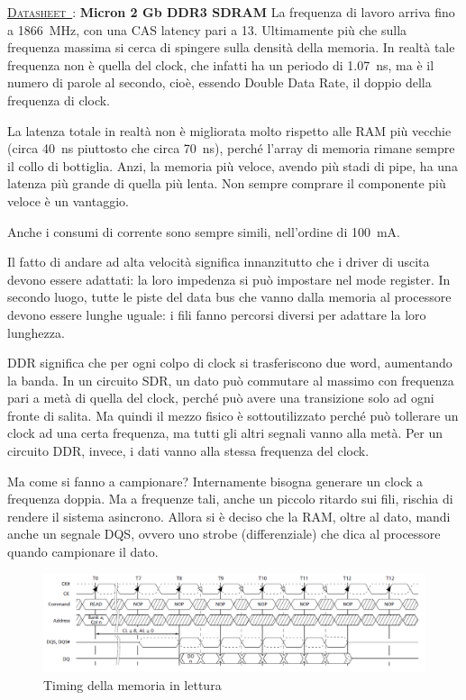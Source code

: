 \documentclass[11pt,4paper]{report}
\newcounter{datasheetcnt}
\renewcommand{\thedatasheetcnt}{\arabic{datasheetcnt}}
\newenvironment{datasheet}[2]{\refstepcounter{datasheetcnt}\par\bigskip\medskip \label{#2}
	\noindent \underline{\textsc{Datasheet~\thedatasheetcnt}}: \textbf{#1} \newline}{\medskip}
\begin{document}
\begin{datasheet}{Micron 2 Gb DDR3 SDRAM}{}\label{ds:ddr3}
La frequenza di lavoro arriva fino a \SI{1866}{\mega\hertz}, con una CAS latency pari a 13. Ultimamente più che sulla frequenza massima si cerca di spingere sulla densità della memoria. In realtà tale frequenza non è quella del clock, che infatti ha un periodo di \SI{1.07}{\nano\second}, ma è il numero di parole al secondo, cioè, essendo Double Data Rate, il doppio della frequenza di clock.

La latenza totale in realtà non è migliorata molto rispetto alle RAM più vecchie (circa \SI{40}{\nano\second} piuttosto che circa \SI{70}{\nano\second}), perché l'array di memoria rimane sempre il collo di bottiglia. Anzi, la memoria più veloce, avendo più stadi di pipe, ha una latenza più grande di quella più lenta. Non sempre comprare il componente più veloce è un vantaggio. 

Anche i consumi di corrente sono sempre simili, nell'ordine di \SI{100}{\milli\ampere}.

Il fatto di andare ad alta velocità significa innanzitutto che i driver di uscita devono essere adattati: la loro impedenza si può impostare nel mode register. In secondo luogo, tutte le piste del data bus che vanno dalla memoria al processore devono essere lunghe uguale: i fili fanno percorsi diversi per adattare la loro lunghezza.

DDR significa che per ogni colpo di clock si trasferiscono due word, aumentando la banda. In un circuito SDR, un dato può commutare al massimo con frequenza pari a metà di quella del clock, perché può avere una transizione solo ad ogni fronte di salita. Ma quindi il mezzo fisico è sottoutilizzato perché può tollerare un clock ad una certa frequenza, ma tutti gli altri segnali vanno alla metà. Per un circuito DDR, invece, i dati vanno alla stessa frequenza del clock. 

Ma come si fanno a campionare? Internamente bisogna generare un clock a frequenza doppia. Ma a frequenze tali, anche un piccolo ritardo sui fili, rischia di rendere il sistema asincrono. Allora si è deciso che la RAM, oltre al dato, mandi anche un segnale DQS, ovvero uno strobe (differenziale) che dica al processore quando campionare il dato.
\begin{figure}[hbtp]
	\centering
	\includegraphics[width=\linewidth]{memorie/ddr_timing}
	\caption{Timing della memoria in lettura}
\end{figure}
\end{datasheet}
\end{document}
